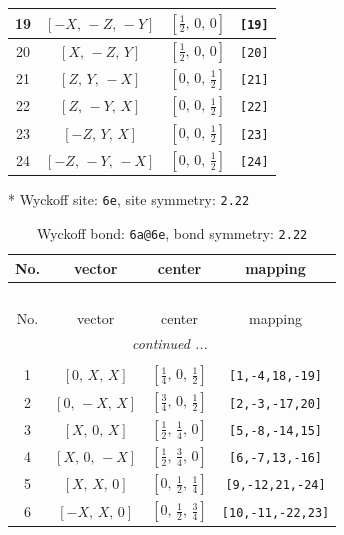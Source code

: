 \documentclass[fleqn,8pt]{jsarticle}
\begin{document}
\begin{longtable}{cccc}
19 & $\left[ - X,\, - Z,\, - Y \right]$ & $\left[ \frac{1}{2},\, 0,\, 0 \right]$ & {\tt [19]} \\ \hline
20 & $\left[ X,\, - Z,\, Y \right]$ & $\left[ \frac{1}{2},\, 0,\, 0 \right]$ & {\tt [20]} \\ \hline
21 & $\left[ Z,\, Y,\, - X \right]$ & $\left[ 0,\, 0,\, \frac{1}{2} \right]$ & {\tt [21]} \\ \hline
22 & $\left[ Z,\, - Y,\, X \right]$ & $\left[ 0,\, 0,\, \frac{1}{2} \right]$ & {\tt [22]} \\ \hline
23 & $\left[ - Z,\, Y,\, X \right]$ & $\left[ 0,\, 0,\, \frac{1}{2} \right]$ & {\tt [23]} \\ \hline
24 & $\left[ - Z,\, - Y,\, - X \right]$ & $\left[ 0,\, 0,\, \frac{1}{2} \right]$ & {\tt [24]} \\
\end{longtable}
* Wyckoff site: {\tt 6e}, site symmetry: {\tt 2.22}
\renewcommand{\arraystretch}{1.2}
\begin{longtable}{cccc}
\caption{Wyckoff bond: {\tt 6a@6e}, bond symmetry: {\tt 2.22}}
 \\
 \hline \hline
No. & vector & center & mapping \\ \hline \endfirsthead

\multicolumn{3}{l}{\tablename\ \thetable{}} \\
 \hline \hline
No. & vector & center & mapping \\ \hline \endhead

 \hline \hline
\multicolumn{3}{r}{\footnotesize\it continued ...} \\ \endfoot

 \hline \hline
\multicolumn{3}{r}{} \\ \endlastfoot

1 & $\left[ 0,\, X,\, X \right]$ & $\left[ \frac{1}{4},\, 0,\, \frac{1}{2} \right]$ & {\tt [1,-4,18,-19]} \\ \hline
2 & $\left[ 0,\, - X,\, X \right]$ & $\left[ \frac{3}{4},\, 0,\, \frac{1}{2} \right]$ & {\tt [2,-3,-17,20]} \\ \hline
3 & $\left[ X,\, 0,\, X \right]$ & $\left[ \frac{1}{2},\, \frac{1}{4},\, 0 \right]$ & {\tt [5,-8,-14,15]} \\ \hline
4 & $\left[ X,\, 0,\, - X \right]$ & $\left[ \frac{1}{2},\, \frac{3}{4},\, 0 \right]$ & {\tt [6,-7,13,-16]} \\ \hline
5 & $\left[ X,\, X,\, 0 \right]$ & $\left[ 0,\, \frac{1}{2},\, \frac{1}{4} \right]$ & {\tt [9,-12,21,-24]} \\ \hline
6 & $\left[ - X,\, X,\, 0 \right]$ & $\left[ 0,\, \frac{1}{2},\, \frac{3}{4} \right]$ & {\tt [10,-11,-22,23]} \\
\end{longtable}
\end{document}

